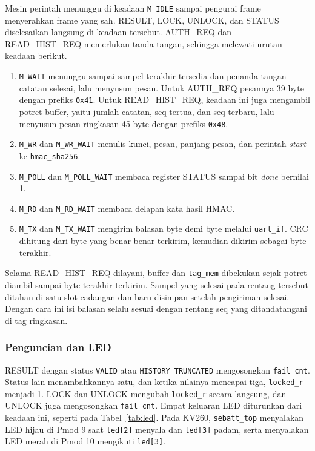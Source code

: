 \documentclass[11pt,a4paper]{article}
\begin{document}
Mesin perintah menunggu di keadaan \texttt{M\_IDLE} sampai pengurai frame menyerahkan frame yang
sah. RESULT, LOCK, UNLOCK, dan STATUS diselesaikan langsung di keadaan tersebut. AUTH\_REQ dan
READ\_HIST\_REQ memerlukan tanda tangan, sehingga melewati urutan keadaan berikut.
\begin{enumerate}
  \item \texttt{M\_WAIT} menunggu sampai sampel terakhir tersedia dan penanda tangan catatan
    selesai, lalu menyusun pesan. Untuk AUTH\_REQ pesannya 39 byte dengan prefiks \texttt{0x41}.
    Untuk READ\_HIST\_REQ, keadaan ini juga mengambil potret buffer, yaitu jumlah catatan, seq
    tertua, dan seq terbaru, lalu menyusun pesan ringkasan 45 byte dengan prefiks \texttt{0x48}.
  \item \texttt{M\_WR} dan \texttt{M\_WR\_WAIT} menulis kunci, pesan, panjang pesan, dan perintah
    \textit{start} ke \texttt{hmac\_sha256}.
  \item \texttt{M\_POLL} dan \texttt{M\_POLL\_WAIT} membaca register STATUS sampai bit
    \textit{done} bernilai 1.
  \item \texttt{M\_RD} dan \texttt{M\_RD\_WAIT} membaca delapan kata hasil HMAC.
  \item \texttt{M\_TX} dan \texttt{M\_TX\_WAIT} mengirim balasan byte demi byte melalui
    \texttt{uart\_if}. CRC dihitung dari byte yang benar-benar terkirim, kemudian dikirim sebagai
    byte terakhir.
\end{enumerate}
Selama READ\_HIST\_REQ dilayani, buffer dan \texttt{tag\_mem} dibekukan sejak potret diambil
sampai byte terakhir terkirim. Sampel yang selesai pada rentang tersebut ditahan di satu slot
cadangan dan baru disimpan setelah pengiriman selesai. Dengan cara ini isi balasan selalu sesuai
dengan rentang seq yang ditandatangani di tag ringkasan.

\subsubsection*{Penguncian dan LED}

RESULT dengan status \texttt{VALID} atau \texttt{HISTORY\_TRUNCATED} mengosongkan
\texttt{fail\_cnt}. Status lain menambahkannya satu, dan ketika nilainya mencapai tiga,
\texttt{locked\_r} menjadi 1. LOCK dan UNLOCK mengubah \texttt{locked\_r} secara langsung, dan
UNLOCK juga mengosongkan \texttt{fail\_cnt}. Empat keluaran LED diturunkan dari keadaan ini, seperti
pada Tabel~\ref{tab:led}. Pada KV260, \texttt{sebatt\_top} menyalakan LED hijau di Pmod 9 saat
\texttt{led[2]} menyala dan \texttt{led[3]} padam, serta menyalakan LED merah di Pmod 10 mengikuti
\texttt{led[3]}.
\end{document}
